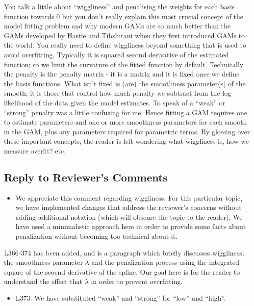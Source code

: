 \documentclass[
]{article}
\providecommand{\tightlist}{%
  \setlength{\itemsep}{0pt}\setlength{\parskip}{0pt}}
\begin{document}
You talk a little about ``wiggliness'' and penalising the weights for each basis function towards 0 but you don't really explain this most crucial concept of the model fitting problem and why modern GAMs are so much better than the GAMs developed by Hastie and Tibshirani when they first introduced GAMs to the world.
You really need to define wiggliness beyond something that is used to avoid overfitting. Typically it is squared second derivative of the estimated function; so we limit the curvature of the fitted function by default. Technically the penalty is the penalty matrix - it is a matrix and it is fixed once we define the basis functions. What isn't fixed is (are) the smoothness parameter(s) of the smooth; it is those that control how much penalty we subtract from the log-likelihood of the data given the model estimates. To speak of a ``weak'' or ``strong'' penalty was a little confusing for me.
Hence fitting a GAM requires one to estimate parameters and one or more smoothness parameters for each smooth in the GAM, plus any parameters required for parametric terms.
By glossing over these important concepts, the reader is left wondering what wiggliness is, how we measure overfit? etc.

\hypertarget{section-6}{%
\subsection{\texorpdfstring{\textcolor{reviewersblue} {Reply to Reviewer's Comments}}{}}\label{section-6}}

\begin{itemize}
\tightlist
\item
  We appreciate this comment regarding wiggliness. For this particular topic, we have implemented changes that address the reviewer's concerns without adding additional notation (which will obscure the topic to the reader). We have used a minimalistic approach here in order to provide some facts about penalization without becoming too technical about it.
\end{itemize}

L366-374 has been added, and is a paragraph which briefly discusses wiggliness, the smoothness parameter \(\lambda\) and the penalization process using the integrated square of the seocnd derivative of the spline. Our goal here is for the reader to understand the effect that \(\lambda\) in order to prevent overfitting.

\begin{itemize}
\tightlist
\item
  L373: We have substituted ``weak'' and ``strong'' for ``low'' and ``high''.
\end{itemize}
\end{document}
